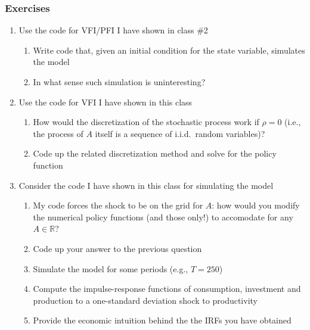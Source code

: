 \documentclass[10pt, aspectratio=1610, handout]{beamer}
\begin{document}
  \begin{frame}
    \frametitle{Exercises}

    \begin{enumerate}
      \item Use the code for VFI/PFI I have shown in class \#2
        \begin{enumerate}
          \item Write code that, given an initial condition for the state variable, simulates the model
          \item In what sense such simulation is uninteresting?
        \end{enumerate}
      \vfill
      \item Use the code for VFI I have shown in this class
        \begin{enumerate}
          \item How would the discretization of the stochastic process work if $\rho = 0$ (i.e., the process of $A$ itself is a sequence of i.i.d.~random variables)?
          \item Code up the related discretization method and solve for the policy function
        \end{enumerate}
      \vfill
      \item Consider the code I have shown in this class for simulating the model
        \begin{enumerate}
          \item My code forces the shock to be on the grid for $A$: how would you modify the numerical policy functions (and those only!) to accomodate for any $A \in \mathbb{R}$?
          \item Code up your answer to the previous question
          \item Simulate the model for some periods (e.g., $T=250$)
          \item Compute the impulse-response functions of consumption, investment and production to a one-standard deviation shock to productivity
          \item Provide the economic intuition behind the the IRFs you have obtained
        \end{enumerate}
    \end{enumerate}

  \end{frame}
\end{document}
